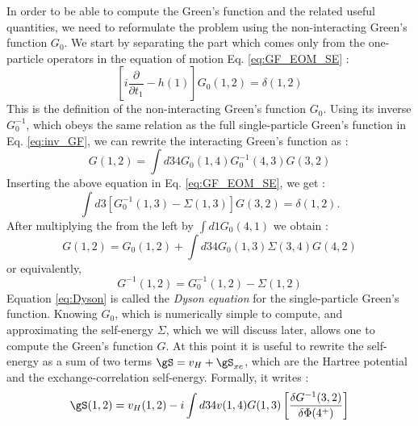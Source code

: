 In order to be able to compute the Green's function and the related useful quantities, we need to reformulate the problem using the non-interacting Green's function $G_0$. We start by separating the part which comes only from the one-particle operators in the equation of motion Eq. \eqref{eq:GF_EOM_SE} :
\begin{equation}
	\left[ i\frac{\partial}{\partial t_1} - h(1) \right] G_0(1,2) = \delta(1,2)
\end{equation}
This is the definition of the non-interacting Green's function $G_0$. Using its inverse $G_0^{-1}$, which obeys the same relation as the full single-particle Green's function in Eq. \eqref{eq:inv_GF}, we can rewrite the interacting Green's function as :
\begin{equation}
	G(1,2) = \int d34 G_0(1,4)G^{-1}_0(4,3)G(3,2)
\end{equation}
Inserting the above equation in Eq. \eqref{eq:GF_EOM_SE}, we get :
\begin{equation}
	\int d3 \left[ G_0^{-1}(1,3) - \Sigma(1,3) \right] G(3,2) = \delta(1,2).
\end{equation}
After multiplying the from the left by $\int d1 G_0(4,1)$ we obtain :
\begin{equation}
	G(1,2) = G_0(1,2) + \int d34 G_0(1,3) \Sigma(3,4) G(4,2) \label{eq:Dyson}
\end{equation}
or equivalently,
\begin{equation}
	G^{-1}(1,2) = G_0^{-1}(1,2) - \Sigma(1,2)
\end{equation}
Equation \eqref{eq:Dyson} is called the \textit{Dyson equation} for the single-particle Green's function. Knowing $G_0$, which is numerically simple to compute, and approximating the self-energy $\Sigma$, which we will discuss later, allows one to compute the Green's function $G$. At this point it is useful to rewrite the self-energy as a sum of two terms $\gS = v_H + \gS_{xc}$, which are the Hartree potential and the exchange-correlation self-energy. Formally, it writes :
\begin{equation}
	\gS(1,2) = v_H(1,2) - i\int d34 v(1,4)G(1,3) \left[ \frac{\delta G^{-1}(3,2)}{\delta \Phi(4^+)} \right] 
\end{equation}
%
